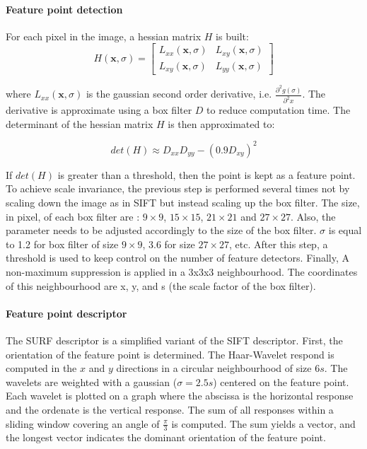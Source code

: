 \documentclass[12pt]{article}
\begin{document}
\paragraph{Feature point detection}

 For each pixel in the image, a hessian matrix $H$ is built: 
\[
  H(\mathbf{x}, \sigma) =
  \left [
  \begin{matrix}
    L_{xx}(\mathbf{x}, \sigma) & L_{xy}(\mathbf{x}, \sigma) \\
    L_{xy}(\mathbf{x}, \sigma) & L_{yy}(\mathbf{x}, \sigma)
  \end{matrix}
  \right ]
\]

where $L_{xx}(\mathbf{x}, \sigma)$ is the gaussian second order derivative, i.e. $\frac{\partial^2 g(\sigma)}{\partial^2 x}$. The derivative is approximate using a box filter $D$ to reduce computation time.  The determinant of the hessian matrix $H$ is then approximated to:

\[
det(H) \approx D_{xx}D_{yy} - (0.9D_{xy})^2
\]

If $det(H)$ is greater than a threshold, then the point is kept as a feature point.
To achieve scale invariance, the previous step is performed several times not by scaling down the image as in SIFT\cite{Sift04} but instead scaling up the box filter. The size, in pixel, of each box filter are : $9\times9$, $15\times15$, $21\times21$ and $27\times27$.  Also, the parameter needs to be adjusted accordingly to the size of the box filter. $\sigma$ is equal to 1.2 for box filter of size $9\times9$, 3.6 for size $27\times27$, etc. After this step, a threshold is used to keep control on the number of feature detectors. Finally, A non-maximum suppression is applied in a 3x3x3 neighbourhood. The coordinates of this neighbourhood are x, y, and s (the scale factor of the box filter).

\paragraph{Feature point descriptor}

The SURF descriptor is a simplified variant of the SIFT descriptor. First, the orientation of the feature point is determined. The Haar-Wavelet respond is computed in the $x$ and $y$ directions in a circular neighbourhood of size $6s$. The wavelets are weighted with a gaussian ($\sigma = 2.5s$) centered on the feature point. Each wavelet is plotted on a graph where the abscissa is the horizontal response and the ordenate is the vertical response. The sum of all responses within a sliding window covering an angle of $\frac{\pi}{3}$ is computed. The sum yields a vector, and the longest vector indicates the dominant orientation of the feature point. 
\end{document}
